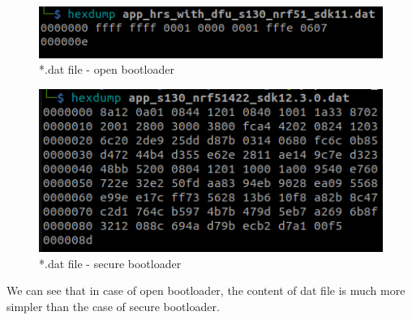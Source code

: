\documentclass{article}
\theoremstyle{plain}
\theoremstyle{definition}
\numberwithin{equation}{section}
\begin{document}
\begin{figure}[H]
	\centering
	\includegraphics[width=0.7\linewidth]{images/dat-open}
	\caption{*.dat file - open bootloader}
	\label{fig:dat-open}
\end{figure}

\begin{figure}[H]
	\centering
	\includegraphics[width=0.7\linewidth]{images/dat-secure}
	\caption{*.dat file - secure bootloader}
	\label{fig:dat-secure}
\end{figure}
We can see that in case of open bootloader, the content of dat file is much more simpler than the case of secure bootloader.
\end{document}
